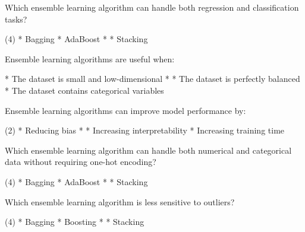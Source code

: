 \documentclass[10pt]{extarticle}
\begin{document}
\begin{exercise}
    Which ensemble learning algorithm can handle both regression and classification tasks?
    \begin{choice} (4)
        * Bagging
        * AdaBoost
        * 
        * Stacking
    \end{choice}
\end{exercise}
\begin{solution}
\end{solution}

\begin{exercise}
    Ensemble learning algorithms are useful when:
    \begin{choice}
        * The dataset is small and low-dimensional
        * 
        * The dataset is perfectly balanced
        * The dataset contains categorical variables
    \end{choice}
\end{exercise}
\begin{solution}
\end{solution}

\begin{exercise}
    Ensemble learning algorithms can improve model performance by:
    \begin{choice} (2)
        * Reducing bias
        * 
        * Increasing interpretability
        * Increasing training time
    \end{choice}
\end{exercise}
\begin{solution}
\end{solution}

\begin{exercise}
    Which ensemble learning algorithm can handle both numerical and categorical data without requiring one-hot encoding?
    \begin{choice} (4)
        * Bagging
        * AdaBoost
        * 
        * Stacking
    \end{choice}
\end{exercise}
\begin{solution}
\end{solution}

\begin{exercise}
    Which ensemble learning algorithm is less sensitive to outliers?
    \begin{choice} (4)
        * Bagging
        * Boosting
        * 
        * Stacking
    \end{choice}
\end{exercise}
\begin{solution}
\end{solution}
\end{document}

